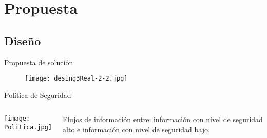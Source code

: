  \section{Propuesta}
 
\subsection{Diseño}
\begin{frame}{Propuesta de solución}
	\begin{figure}[t!]
		\begin{center} 
		\texttt{[image: desing3Real-2-2.jpg]} 
		\end{center}
	\end{figure}
\end{frame}
\begin{frame}{Política de Seguridad}
	\begin{columns}[c]
	\column{1.5in}
	\begin{center}
	\texttt{[image: Politica.jpg]} 
	\end{center}
	\column{1.5in}
	Flujos de información entre: información con nivel de seguridad alto e
	información con nivel de seguridad bajo.
	\end{columns}
\end{frame}

